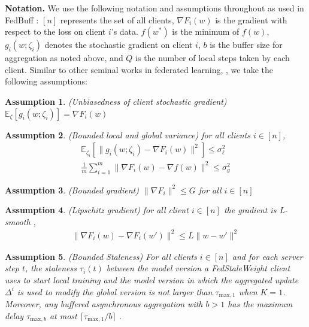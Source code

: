 \documentclass{article}
\newtheorem{assumption}{Assumption}
\begin{document}
\textbf{Notation. } We use the following notation and assumptions throughout as used in FedBuff \cite{nguyen2022federated}: $[n]$ represents the set of all clients, $\nabla F_i(w)$ is the gradient with respect to the loss on client $i$'s data. $f(w^*)$ is the minimum of $f(w)$, $g_i(w;\zeta_i)$ denotes the stochastic gradient on client $i$, $b$ is the buffer size for aggregation as noted above, and $Q$ is the number of local steps taken by each client. Similar to other seminal works in federated learning,  \cite{li2020federated} \cite{reddi2020adaptive} \cite{karimireddy2021scaffold} \cite{yu2018parallel}, we take the following assumptions: 

\begin{assumption}
    \label{assumption:unbiasedness}
    (Unbiasedness of client stochastic gradient) \; $\mathbb{E}_{\zeta}[g_i(w;\zeta_i)] = \nabla F_i(w)$
\end{assumption}

\begin{assumption}
    \label{assumption:bounded-local-global-variance}
    (Bounded local and global variance) for all clients $i \in [n]$, \; 
    \begin{gather*}
        \mathbb{E}_{\zeta_i}[\|g_i(w;\zeta_i) - \nabla F_i(w) \|^2] \leq \sigma_\ell^2
        \\
        \frac{1}{m}\sum_{i=1}^m\|\nabla F_i(w) - \nabla f(w)\|^2 \leq \sigma_g^2
    \end{gather*}
\end{assumption}

\begin{assumption}
    \label{assumption:bounded-gradient}
    (Bounded gradient) \; $\|\nabla F_i \|^2 \leq G$ \emph{ for all } $i \in [n]$
\end{assumption}

\begin{assumption}
    \label{assumption:lipschitz-gradient}
    (Lipschitz gradient) \; \emph{for all client } $i \in [n]$ \emph{ the gradient is L-smooth },
    \begin{gather*}
        \|\nabla F_i(w) - \nabla F_i(w') \|^2 \leq L \|w - w'\|^2
    \end{gather*}
\end{assumption}

\begin{assumption}
    \label{assumption:bounded-staleness}
    (Bounded Staleness) \; For all clients $i \in [n]$ and for each server step $t$, the staleness $\tau_i(t)$ between the model version a FedStaleWeight client uses to start local training and the model version in which the aggregated update $\Delta^i$ is used to modify the global version is not larger than $\tau_{\text{max}, 1}$ when $K=1$. Moreover, any buffered asynchronous aggregation with $b > 1$ has the maximum delay $\tau_{\text{max}, b}$ at most $\lceil \tau_{\text{max}, 1} / b \rceil$ \cite{nguyen2022federated}.
\end{assumption}
\end{document}
